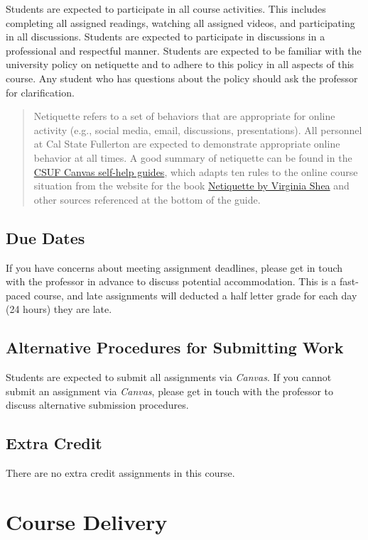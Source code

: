 \documentclass[12pt, letterpaper]{article}
\begin{document}
Students are expected to participate in all course activities. This includes completing all assigned readings, watching all assigned videos, and participating in all discussions. Students are expected to participate in discussions in a professional and respectful manner. Students are expected to be familiar with the university policy on netiquette and to adhere to this policy in all aspects of this course. Any student who has questions about the policy should ask the professor for clarification. 

\begin{quote}Netiquette refers to a set of behaviors that are appropriate for online activity (e.g., social media, email, discussions, presentations). All personnel at Cal State Fullerton are expected to demonstrate appropriate online behavior at all times. A good summary of netiquette can be found in the \href{https://canvashelp.fullerton.edu/m/Student/l/1336786-student-what-is-netiquette}{CSUF Canvas self-help guides}, which adapts ten rules to the online course situation from the website for the book \href{http://www.albion.com/netiquette/corerules.html}{Netiquette by Virginia Shea} and other sources referenced at the bottom of the guide.\end{quote}

\subsection*{Due Dates}
If you have concerns about meeting assignment deadlines, please get in touch with the professor in advance to discuss potential accommodation. This is a fast-paced course, and late assignments will deducted a half letter grade for each day (24 hours) they are late.

\subsection*{Alternative Procedures for Submitting Work}
Students are expected to submit all assignments via \emph{Canvas}. If you cannot submit an assignment via \emph{Canvas}, please get in touch with the professor to discuss alternative submission procedures.

\subsection*{Extra Credit}
There are no extra credit assignments in this course. 

\section*{Course Delivery}
\end{document}
